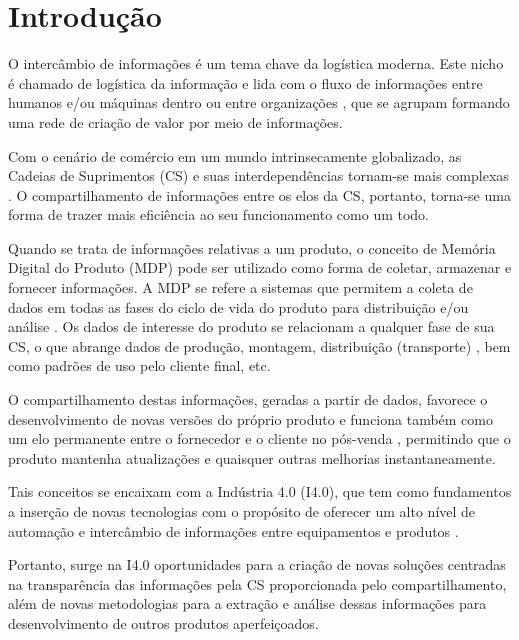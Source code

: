 \chapter{Introdução}
\label{cha:introducao}

O intercâmbio de informações é um tema chave da logística moderna. Este nicho é chamado de logística da informação e lida com o fluxo de informações entre humanos e/ou máquinas dentro ou entre organizações \cite{haftor2011information}, que se agrupam formando uma rede de criação de valor por meio de informações.

Com o cenário de comércio em um mundo intrinsecamente globalizado, as Cadeias de Suprimentos (CS) e suas interdependências tornam-se mais complexas \cite{surana2005supplychain}. O compartilhamento de informações entre os elos da CS, portanto, torna-se uma forma de trazer mais eficiência ao seu funcionamento como um todo.

Quando se trata de informações relativas a um produto, o conceito de Memória Digital do Produto (MDP) pode ser utilizado como forma de coletar, armazenar e fornecer informações. A MDP se refere a sistemas que permitem a coleta de dados em todas as fases do ciclo de vida do produto para distribuição e/ou análise \cite{wahlster2007digitalmemory}. Os dados de interesse do produto se relacionam a qualquer fase de sua CS, o que abrange dados de produção, montagem, distribuição (transporte) \cite{brandherm2011productmemory}, bem como padrões de uso pelo cliente final, etc.

O compartilhamento destas informações, geradas a partir de dados, favorece o desenvolvimento de novas versões do próprio produto e funciona também como um elo permanente entre o fornecedor e o cliente no pós-venda \cite{brandherm2011productmemory}, permitindo que o produto mantenha atualizações e quaisquer outras melhorias instantaneamente.

Tais conceitos se encaixam com a Indústria 4.0 (I4.0), que tem como fundamentos a inserção de novas tecnologias com o propósito de oferecer um alto nível de automação e intercâmbio de informações entre equipamentos e produtos \cite{lasi2014industryfour}.

Portanto, surge na I4.0 oportunidades para a criação de novas soluções centradas na transparência das informações pela CS \cite{lasi2014industryfour} proporcionada pelo compartilhamento, além de novas metodologias para a extração e análise dessas informações para desenvolvimento de outros produtos aperfeiçoados.

